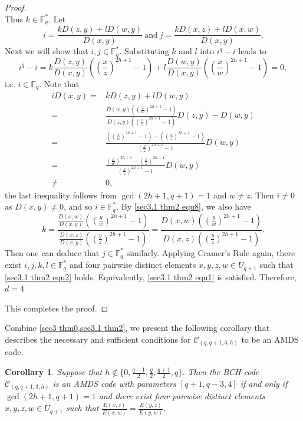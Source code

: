 \documentclass[10pt]{article}%
\newtheorem{corollary}{Corollary}
\begin{document}
\begin{proof}
\begin{equation*}
		 \end{equation*}
		 Thus $k\in\mathbb{F}_q^\ast$. Let
		 \begin{equation*}
		 	i=\frac{kD(z,y)+lD(w,y)}{D(x,y)}\ \mathrm{and}\ j=\frac{kD(x,z)+lD(x,w)}{D(x,y)}.
		 \end{equation*}
		 Next we will show that $i,j\in\mathbb{F}_q^\ast$. Substituting $k$ and $l$ into $i^q-i$ leads to 
		 \begin{equation*}
		 	i^q-i=k\frac{D(z,y)}{D(x,y)}\left(\left(\frac{x}{z}\right)^{2h+1}-1\right)+l\frac{D(w,y)}{D(x,y)}\left(\left(\frac{x}{w}\right)^{2h+1}-1\right)=0,
		 \end{equation*}
		 i.e. $i\in\mathbb{F}_q$. Note that
		 \begin{equation*}
		 	\begin{aligned}
		 		iD(x,y)=&kD(z,y)+lD(w,y)\\
		 		=&\frac{D(w,y)\left(\left(\frac{x}{w}\right)^{2h+1}-1\right)}{D(z,y)\left(\left(\frac{x}{z}\right)^{2h+1}-1\right)}D(z,y)-D(w,y)\\
		 		=&\frac{\left(\left(\frac{x}{w}\right)^{2h+1}-1\right)-\left(\left(\frac{x}{z}\right)^{2h+1}-1\right)}{\left(\frac{x}{z}\right)^{2h+1}-1}D(w,y)\\
		 		=&\frac{\left(\frac{x}{w}\right)^{2h+1}-\left(\frac{x}{z}\right)^{2h+1}}{\left(\frac{x}{z}\right)^{2h+1}-1}D(w,y)\\
		 		\ne&0,
		 	\end{aligned}
		 \end{equation*}
		 the last inequality follows from $\gcd(2h+1,q+1)=1$ and $w\ne z$. Then $i\ne 0$ as $D(x,y)\ne 0$, and so $i\in\mathbb{F}_q^\ast$. By \cref{sec3.1 thm2 equ8}, we also have 
		 \begin{equation*}
		 	k=\frac{\frac{D(x,w)}{D(x,y)}\left(\left(\frac{y}{w}\right)^{2h+1}-1\right)}{\frac{D(x,z)}{D(x,y)}\left(\left(\frac{y}{z}\right)^{2h+1}-1\right)}=\frac{D(x,w)\left(\left(\frac{y}{w}\right)^{2h+1}-1\right)}{D(x,z)\left(\left(\frac{y}{z}\right)^{2h+1}-1\right)}.
		 \end{equation*}
		 Then one can deduce that $j\in\mathbb{F}_q^\ast$ similarly. Applying Cramer's Rule again, there exist $i,j,k,l\in\mathbb{F}_q^\ast$ and four pairwise distinct elements $x,y,z,w\in U_{q+1}$ such that \cref{sec3.1 thm2 equ2} holds. Equivalently, \cref{sec3.1 thm2 equ1} is satisfied. Therefore, $d=4$
		 
		 This completes the proof.
	\end{proof}
	
	Combine \cref{sec3 thm0,sec3.1 thm2}, we present the following corollary that describes the necessary and sufficient conditions for $\mathcal{C}_{(q,q+1,3,h)}$ to be an AMDS code.
	\begin{corollary}\label{sec3 cor4}
		Suppose that $h\notin\{0,\frac{q-1}{2},\frac{q}{2},\frac{q+1}{2},q\}$. Then the BCH code $\mathcal{C}_{(q,q+1,3,h)}$ is an AMDS code with parameters $[q+1,q-3,4]$ if and only if $\gcd(2h+1,q+1)=1$ and there exist four pairwise distinct elements $x,y,z,w\in U_{q+1}$ such that $\frac{E(x,z)}{E(x,w)}=\frac{E(y,z)}{E(y,w)}$.
	\end{corollary}
	
\end{document}
